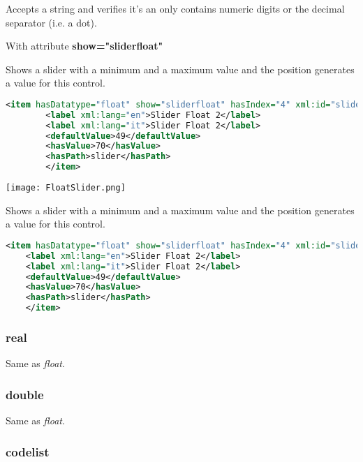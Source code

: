 Accepts a string and verifies it's an only contains numeric digits or the decimal separator (i.e. a dot).

\begin{mdframed}
	With attribute \textbf{show="sliderfloat"}
	
	Shows a slider  with a minimum and a maximum value and the position generates a value for this control.
	
	\begin{lstlisting}[language=xml]
		<item hasDatatype="float" show="sliderfloat" hasIndex="4" xml:id="slider2" isFixed="false" min="0.0" max="100.00" step="0.5">
		<label xml:lang="en">Slider Float 2</label>
		<label xml:lang="it">Slider Float 2</label>
		<defaultValue>49</defaultValue>
		<hasValue>70</hasValue>
		<hasPath>slider</hasPath>
		</item>
	\end{lstlisting}
	
	
	{\centering
		\texttt{[image: FloatSlider.png]}
		\par
	}
	
	
\end{mdframed}


Shows a slider with a minimum and a maximum value and the position generates a value for this control.

\begin{lstlisting}[language=xml]
	<item hasDatatype="float" show="sliderfloat" hasIndex="4" xml:id="slider2" isFixed="false" min="0.0" max="100.00" step="0.5">
	<label xml:lang="en">Slider Float 2</label>
	<label xml:lang="it">Slider Float 2</label>
	<defaultValue>49</defaultValue>
	<hasValue>70</hasValue>
	<hasPath>slider</hasPath>
	</item>
\end{lstlisting}


\subsubsection{real}
\label{double}

Same as \textit{float}.

\subsubsection{double}
\label{double}

Same as \textit{float}.


\subsubsection{codelist}
\label{codelist}


